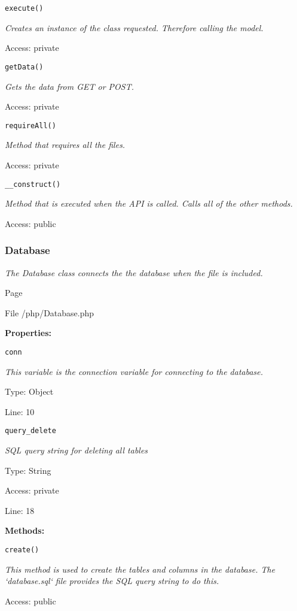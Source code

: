 \texttt{execute()}

{\scriptsize
\textit{Creates an instance of the class requested.
Therefore calling the model.}

Access: private

}

\texttt{getData()}

{\scriptsize
\textit{Gets the data from GET or POST.}

Access: private

}

\texttt{requireAll()}

{\scriptsize
\textit{Method that requires all the files.}

Access: private

}

\texttt{\_\_construct()}

{\scriptsize
\textit{Method that is executed when the API is called.
Calls all of the other methods.}

Access: public

}

\subsubsection{Database}
\textit{The Database class connects the the database when the file is included.}

Page \pageref{Database.php}

File /php/Database.php

\textbf{Properties:}

\texttt{conn}

{\scriptsize
\textit{This variable is the connection variable for connecting to the database.}

Type: Object

Line: 10

}
\texttt{query\_delete}

{\scriptsize
\textit{SQL query string for deleting all tables}

Type: String

Access: private

Line: 18

}
\textbf{Methods:}

\texttt{create()}

{\scriptsize
\textit{This method is used to create the tables and columns in the database.
The `database.sql` file provides the SQL query string to do this.}

Access: public

}

